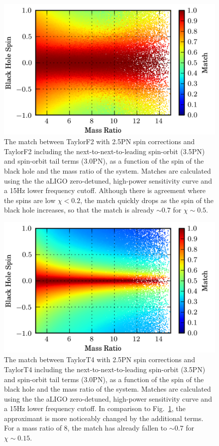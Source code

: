 \begin{figure}
\includegraphics{papers/nsbh_faithfulness/figure4.png}
\caption{\label{fig:5715f2f2}The match between TaylorF2 with 2.5\ac{PN} spin corrections
and TaylorF2 including the next-to-next-to-leading spin-orbit (3.5\ac{PN}) and spin-orbit tail 
terms (3.0\ac{PN}), as a function of the spin of the black hole
and the mass ratio of the system. Matches are calculated using the the aLIGO
zero-detuned, high-power sensitivity curve and a 15Hz lower frequency cutoff. Although 
there is agreement where the spins are low $\chi < 0.2 $, the match quickly drops
as the spin of the black hole increases, so that the match is already $ \sim 0.7 $ for $\chi \sim 0.5$.
}
\end{figure}

\begin{figure}
\includegraphics{papers/nsbh_faithfulness/figure5.png}
\caption{\label{fig:5715t4t4}The match between TaylorT4  with 2.5\ac{PN} spin corrections
and TaylorT4 including the next-to-next-to-leading spin-orbit (3.5\ac{PN}) and spin-orbit tail 
terms (3.0\ac{PN}), as a function of the spin of the black hole
and the mass ratio of the system. Matches are calculated using the the aLIGO
zero-detuned, high-power sensitivity curve and a 15Hz lower frequency cutoff. 
In comparison to Fig.~\ref{fig:5715f2f2}, the approximant is more noticeably changed
by the additional terms. For a mass ratio of 8, the match has already 
fallen to  $ \sim 0.7 $ for $\chi \sim 0.15$. }
\end{figure}

